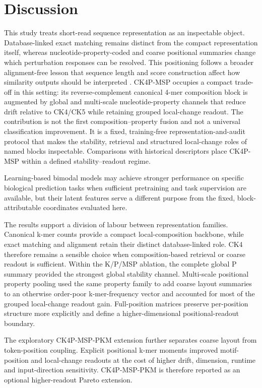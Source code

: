 \section{Discussion}

This study treats short-read sequence representation as an inspectable object. Database-linked exact matching remains distinct from the compact representation itself, whereas nucleotide-property-coded and coarse positional summaries change which perturbation responses can be resolved. This positioning follows a broader alignment-free lesson that sequence length and score construction affect how similarity outputs should be interpreted \citep{Swain2022AFScore}. CK4P-MSP occupies a compact trade-off in this setting: its reverse-complement canonical 4-mer composition block is augmented by global and multi-scale nucleotide-property channels that reduce drift relative to CK4/CK5 while retaining grouped local-change readout. The contribution is not the first composition--property fusion and not a universal classification improvement. It is a fixed, training-free representation-and-audit protocol that makes the stability, retrieval and structured local-change roles of named blocks inspectable. Comparisons with historical descriptors place CK4P-MSP within a defined stability--readout regime.

Learning-based bimodal models may achieve stronger performance on specific biological prediction tasks when sufficient pretraining and task supervision are available, but their latent features serve a different purpose from the fixed, block-attributable coordinates evaluated here.

The results support a division of labour between representation families. Canonical k-mer counts provide a compact local-composition backbone, while exact matching and alignment retain their distinct database-linked role. CK4 therefore remains a sensible choice when composition-based retrieval or coarse readout is sufficient. Within the K/P/MSP ablation, the complete global P summary provided the strongest global stability channel. Multi-scale positional property pooling used the same property family to add coarse layout summaries to an otherwise order-poor k-mer-frequency vector and accounted for most of the grouped local-change readout gain. Full-position matrices preserve per-position structure more explicitly and define a higher-dimensional positional-readout boundary.

The exploratory CK4P-MSP-PKM extension further separates coarse layout from token-position coupling. Explicit positional k-mer moments improved motif-position and local-change readouts at the cost of higher drift, dimension, runtime and input-direction sensitivity. CK4P-MSP-PKM is therefore reported as an optional higher-readout Pareto extension.

